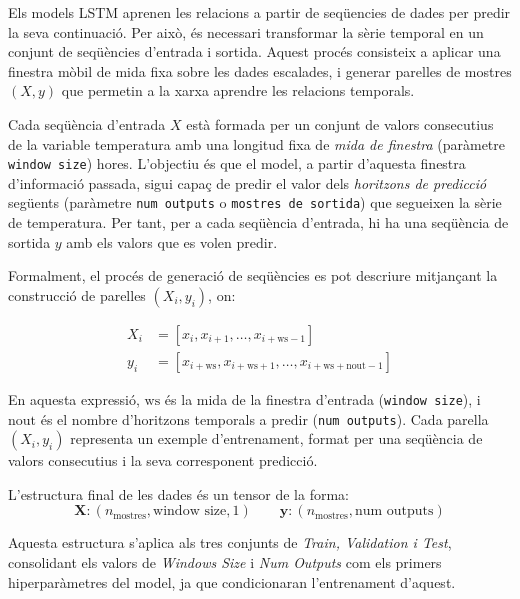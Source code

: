 \documentclass[../main.tex]{subfiles}
\begin{document}
Els models LSTM aprenen les relacions a partir de seqüencies de dades per predir la seva continuació. Per això, és necessari transformar la sèrie temporal en un conjunt de seqüències d’entrada i sortida. Aquest procés consisteix a aplicar una finestra mòbil de mida fixa sobre les dades escalades, i generar parelles de mostres $(X, y)$ que permetin a la xarxa aprendre les relacions temporals.

Cada seqüència d’entrada $X$ està formada per un conjunt de valors consecutius de la variable temperatura amb una longitud fixa de \textit{mida de finestra} (paràmetre \texttt{window size}) hores. L’objectiu és que el model, a partir d’aquesta finestra d’informació passada, sigui capaç de predir el valor dels \textit{horitzons de predicció} següents (paràmetre \texttt{num outputs} o \texttt{mostres de sortida}) que segueixen la sèrie de temperatura. Per tant, per a cada seqüència d’entrada, hi ha una seqüència de sortida $y$ amb els valors que es volen predir.


Formalment, el procés de generació de seqüències es pot descriure mitjançant la construcció de parelles $(X_i, y_i)$, on:

\begin{equation}
\begin{aligned}
X_i &= [x_i, x_{i+1}, \dots, x_{i+\text{ws}-1}] \\
y_i &= [x_{i+\text{ws}}, x_{i+\text{ws}+1}, \dots, x_{i+\text{ws}+\text{nout}-1}]
\end{aligned}
\label{eq:seq_generation}
\end{equation}

En aquesta expressió, \( \text{ws} \) és la mida de la finestra d’entrada (\texttt{window size}), i \( \text{nout} \) és el nombre d’horitzons temporals a predir (\texttt{num outputs}). Cada parella $(X_i, y_i)$ representa un exemple d’entrenament, format per una seqüència de valors consecutius i la seva corresponent predicció.

L’estructura final de les dades és un tensor de la forma:
\begin{equation}
\textbf{X}: (n_{\text{mostres}}, \text{window size}, 1)
\quad\quad
\textbf{y}: (n_{\text{mostres}}, \text{num outputs})
\label{eq:formes_dades}
\end{equation}

Aquesta estructura s'aplica als tres conjunts de \textit{Train, Validation i Test}, consolidant els valors de \textit{Windows Size} i \textit{Num Outputs} com els primers hiperparàmetres del model, ja que condicionaran l'entrenament d'aquest.
\end{document}
